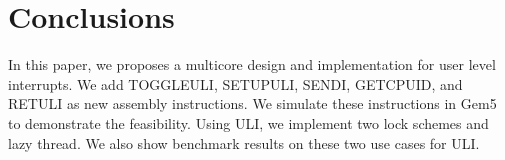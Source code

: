 \section{Conclusions}

In this paper, we proposes a multicore design and implementation for user level interrupts. We add TOGGLEULI, SETUPULI, SENDI, GETCPUID, and RETULI as new assembly instructions. We simulate these instructions in Gem5 to demonstrate the feasibility. Using ULI, we implement two lock schemes and lazy thread. We also show benchmark results on these two use cases for ULI.

